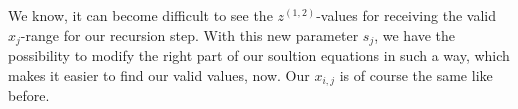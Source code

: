 We know, it can become difficult to see the $z^{\left(1,2\right)}$-values for receiving the valid $x_{j}$-range for our recursion step. With this new parameter $s_{j}$, we have the possibility to modify the right part of our soultion equations in such a way, which makes it easier to find our valid values, now. Our $x_{i,j}$ is of course the same like before.
